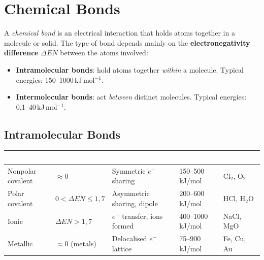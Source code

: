 \documentclass[a4paper,11pt]{article}
\newcommand{\altrow}{\rowcolors{2}{rowcolor}{white}}
\newcommand{\resetrow}{\rowcolors{0}{}{}}
\begin{document}
\clearpage

\section{Chemical Bonds}

\begin{definizione}
A \textit{chemical bond} is an electrical interaction that holds atoms together in a molecule or solid. The type of bond depends mainly on the \textbf{electronegativity difference} $\Delta EN$ between the atoms involved:
\begin{itemize}
  \item \textbf{Intramolecular bonds}: hold atoms together \textit{within} a molecule. Typical energies: 150--1000\,kJ\,mol$^{-1}$.
  \item \textbf{Intermolecular bonds}: act \textit{between} distinct molecules. Typical energies: 0{,}1--40\,kJ\,mol$^{-1}$.
\end{itemize}
\end{definizione}

\subsection{Intramolecular Bonds}

\altrow
\begin{center}
\begin{tabular}{lllll}
\toprule
\rowcolor{epflred!85}
\textcolor{white}{\textbf{Type}} & \textcolor{white}{$\Delta EN$} & \textcolor{white}{\textbf{Description}} & \textcolor{white}{\textbf{Energy}} & \textcolor{white}{\textbf{Example}} \\
\midrule
Nonpolar covalent & $\approx 0$             & Symmetric $e^-$ sharing     & 150--500\,kJ/mol  & Cl$_2$, O$_2$ \\
Polar covalent    & $0 < \Delta EN \leq 1{,}7$ & Asymmetric sharing, dipole & 200--600\,kJ/mol  & HCl, H$_2$O \\
Ionic             & $\Delta EN > 1{,}7$     & $e^-$ transfer, ions formed & 400--1000\,kJ/mol & NaCl, MgO \\
Metallic          & $\approx 0$ (metals)    & Delocalised $e^-$ lattice   & 75--900\,kJ/mol   & Fe, Cu, Au \\
\bottomrule
\end{tabular}
\end{center}
\resetrow
\end{document}

